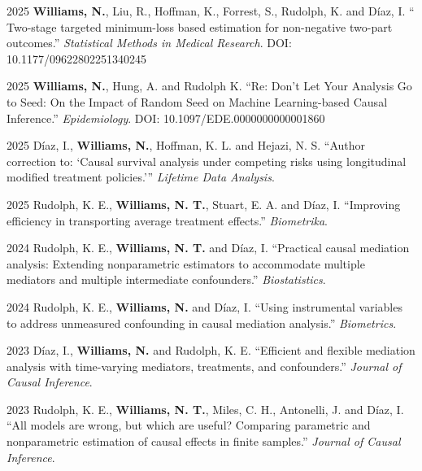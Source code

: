 \documentclass[12pt,letterpaper]{report}
\begin{document}
    \begin{tablist}
   
    \item[2025] \tab \textbf{Williams, N.}, Liu, R., Hoffman, K., Forrest, S., Rudolph, K. and Díaz, I. \enquote{
Two-stage targeted minimum-loss based estimation for non-negative two-part outcomes.} \textit{
Statistical Methods in Medical Research}. DOI: 10.1177/09622802251340245

   \item[2025] \tab \textbf{Williams, N.}, Hung, A. and Rudolph K. \enquote{Re: Don’t Let Your Analysis Go to Seed: On the Impact of Random Seed on Machine Learning-based Causal Inference.} \textit{Epidemiology}. DOI: 10.1097/EDE.0000000000001860
    
    \item[2025] \tab Díaz, I., \textbf{Williams, N.}, Hoffman, K. L. and Hejazi, N. S. \enquote{Author correction to: `Causal survival analysis under competing risks using longitudinal modified treatment policies.'} \textit{Lifetime Data Analysis}.
    
    \item[2025] \tab Rudolph, K. E., \textbf{Williams, N. T.}, Stuart, E. A. and Díaz, I. \enquote{Improving efficiency in transporting average treatment effects.} \textit{Biometrika}.
    
    \item[2024] \tab Rudolph, K. E., \textbf{Williams, N. T.} and Díaz, I. \enquote{Practical causal mediation analysis: Extending nonparametric estimators to accommodate multiple mediators and multiple intermediate confounders.} \textit{Biostatistics}.
    
    \item[2024] \tab Rudolph, K. E., \textbf{Williams, N.} and Díaz, I. \enquote{Using instrumental variables to address unmeasured confounding in causal mediation analysis.} \textit{Biometrics}.
    
    \item[2023] \tab Díaz, I., \textbf{Williams, N.} and Rudolph, K. E. \enquote{Efficient and flexible mediation analysis with time-varying mediators, treatments, and confounders.} \textit{Journal of Causal Inference}.
    
    \item[2023] \tab Rudolph, K. E., \textbf{Williams, N. T.}, Miles, C. H., Antonelli, J. and Díaz, I. \enquote{All models are wrong, but which are useful? Comparing parametric and nonparametric estimation of causal effects in finite samples.} \textit{Journal of Causal Inference}.
    

\end{tablist}
\end{document}
